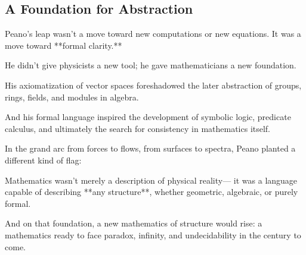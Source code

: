 \subsection*{A Foundation for Abstraction}

Peano’s leap wasn’t a move toward new computations or new equations.  
It was a move toward **formal clarity.**

He didn’t give physicists a new tool;  
he gave mathematicians a new foundation.

His axiomatization of vector spaces foreshadowed the later abstraction of groups, rings, fields, and modules in algebra.

And his formal language inspired the development of symbolic logic, predicate calculus, and ultimately the search for consistency in mathematics itself.

In the grand arc from forces to flows, from surfaces to spectra,  
Peano planted a different kind of flag:

Mathematics wasn’t merely a description of physical reality—  
it was a language capable of describing **any structure**,  
whether geometric, algebraic, or purely formal.

And on that foundation, a new mathematics of structure would rise:  
a mathematics ready to face paradox, infinity, and undecidability in the century to come.

